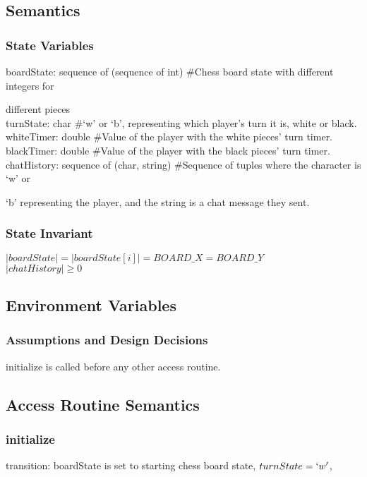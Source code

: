 \documentclass{article}
\begin{document}
    \subsection*{Semantics}
        \subsubsection*{State Variables}
            boardState: sequence of (sequence of int) \#Chess board state with different integers for 
            
            different pieces\\
            turnState: char \#`w' or `b', representing which player's turn it is, white or black. \\
            whiteTimer: double \#Value of the player with the white pieces' turn timer. \\
            blackTimer: double \#Value of the player with the black pieces' turn timer. \\
            chatHistory: sequence of (char, string) \#Sequence of tuples where the character is `w' or 
            
            `b' representing the player, and the string is a chat message they sent. \\
            
        \subsubsection*{State Invariant}
            $|boardState| = |boardState[i]| = BOARD\_X = BOARD\_Y$ \\
            $|chatHistory| \geq 0$
            
    \subsection*{Environment Variables}
        \subsubsection*{Assumptions and Design Decisions}
            initialize is called before any other access routine.
            
    \subsection*{Access Routine Semantics}
        \subsubsection*{initialize} 
            transition: boardState is set to starting chess board state, $turnState = `w'$, 
            
\end{document}
